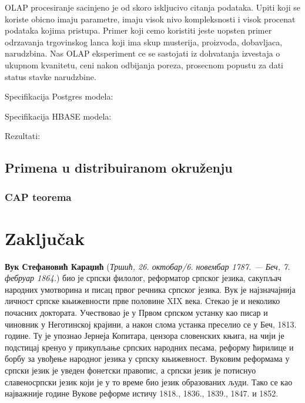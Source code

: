 \documentclass[12pt,oneside]{memoir}
\begin{document}
OLAP procesiranje sacinjeno je od skoro iskljucivo citanja podataka. Upiti koji se koriste obicno imaju parametre, imaju visok nivo kompleksnosti i visok procenat podataka kojima pristupa.
Primer koji cemo koristiti jeste uopsten primer odrzavanja trgovinskog lanca koji ima skup musterija, proizvoda, dobavljaca,  narudzbina. 
Nas OLAP eksperiment ce se sastojati iz dohvatanja izvestaja o ukupnom kvanitetu, ceni nakon odbijanja poreza, prosecnom popustu za dati status stavke narudzbine.


Specifikacija Postgres modela:

Specifikacija HBASE modela:

Rezultati:

\section{Primena u distribuiranom okruženju}
\subsection{CAP teorema}

\chapter{Zaključak}

\literatura

\backmatter

\begin{biografija}
\textbf{Вук Стефановић Караџић} (\emph{Тршић, 26. октобар/6. новембар
  1787. — Беч, 7. фебруар 1864.}) био је српски филолог, реформатор
српског језика, сакупљач народних умотворина и писац првог речника
српског језика.  Вук је најзначајнија личност српске књижевности прве
половине XIX века. Стекао је и неколико почасних доктората.
Учествовао је у Првом српском устанку као писар и чиновник у
Неготинској крајини, а након слома устанка преселио се у Беч,
1813. године. Ту је упознао Јернеја Копитара, цензора словенских
књига, на чији је подстицај кренуо у прикупљање српских народних
песама, реформу ћирилице и борбу за увођење народног језика у српску
књижевност. Вуковим реформама у српски језик је уведен фонетски
правопис, а српски језик је потиснуо славеносрпски језик који је у то
време био језик образованих људи. Тако се као најважније године Вукове
реформе истичу 1818., 1836., 1839., 1847. и 1852.
\end{biografija}
\end{document}

